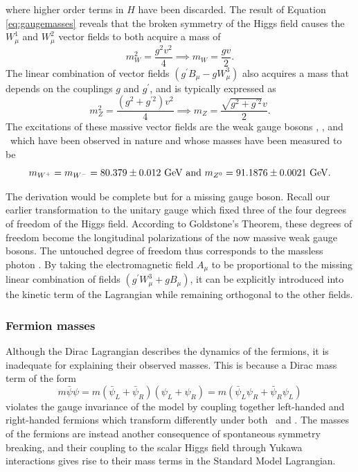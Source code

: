 where higher order terms in $H$ have been discarded. The result of Equation \ref{eq:gaugemasses} reveals that the broken symmetry of the Higgs field causes the $W_{\mu}^{1}$ and $W_{\mu}^{2}$ vector fields to both acquire a mass of
\begin{equation}
  m_{W}^{2} = \frac{g^{2}v^{2}}{4} \implies m_{W} = \frac{gv}{2}.
\end{equation}
The linear combination of vector fields $(g^{\prime}B_{\mu} - gW_{\mu}^{3})$ also acquires a mass that depends on the couplings $g$ and $g^{\prime}$, and is typically expressed as
\begin{equation}
  m_{Z}^{2} = \frac{(g^{2} + g^{\prime 2}) v^{2}}{4} \implies m_{Z} = \frac{\sqrt{g^{2} + g^{\prime 2}} v}{2}.
\end{equation}
The excitations of these massive vector fields are the weak gauge bosons \bosWp, \bosWm, and \bosZn\ which have been observed in nature and whose masses have been measured\cite{PDG2018} to be
\begin{equation}
  m_{\bosWp} = m_{\bosWm} = 80.379 \pm 0.012\ \GeV\ \mathrm{and}\ m_{\bosZn} = 91.1876 \pm 0.0021\ \GeV.
\end{equation}

The derivation would be complete but for a missing gauge boson. Recall our earlier transformation to the unitary gauge which fixed three of the four degrees of freedom of the Higgs field. According to Goldstone's Theorem\cite{Goldstone}, these degrees of freedom become the longitudinal polarizations of the now massive weak gauge bosons. The untouched degree of freedom thus corresponds to the massless photon \bosg. By taking the electromagnetic field $A_{\mu}$ to be proportional to the missing linear combination of fields $(g^{\prime}W_{\mu}^{3} + gB_{\mu})$, it can be explicitly introduced into the kinetic term of the Lagrangian while remaining orthogonal to the other fields.

\subsubsection{Fermion masses}

Although the Dirac Lagrangian describes the dynamics of the fermions, it is inadequate for explaining their observed masses. This is because a Dirac mass term of the form
\begin{equation}
  m\bar{\psi}\psi = m(\bar{\psi}_{L} + \bar{\psi}_{R})(\psi_{L} + \psi_{R}) = m(\bar{\psi}_{L}\psi_{R} + \bar{\psi}_{R}\psi_{L})
\end{equation}
violates the gauge invariance of the model by coupling together left-handed and right-handed fermions which transform differently under both \symWEAK\ and \symEM. The masses of the fermions are instead another consequence of spontaneous symmetry breaking, and their coupling to the scalar Higgs field through Yukawa interactions gives rise to their mass terms in the Standard Model Lagrangian.

